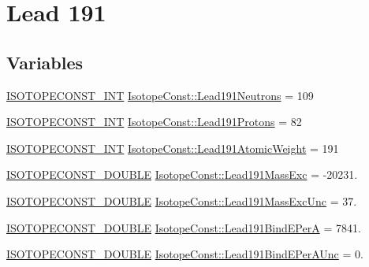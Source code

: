 \hypertarget{group___isotope_const-_lead-_pb191}{}\section{Lead 191}
\label{group___isotope_const-_lead-_pb191}
\subsection*{Variables}
\begin{DoxyCompactItemize}
\item 
\mbox{\hyperlink{group___isotope_const-_macros_ga5f18360b3e99483a35c32d789e62621c}{I\+S\+O\+T\+O\+P\+E\+C\+O\+N\+S\+T\+\_\+\+I\+NT}} \mbox{\hyperlink{group___isotope_const-_lead-_pb191_ga8abe12661e91a3b5e4f3ae4118067eb7}{Isotope\+Const\+::\+Lead191\+Neutrons}} = 109
\item 
\mbox{\hyperlink{group___isotope_const-_macros_ga5f18360b3e99483a35c32d789e62621c}{I\+S\+O\+T\+O\+P\+E\+C\+O\+N\+S\+T\+\_\+\+I\+NT}} \mbox{\hyperlink{group___isotope_const-_lead-_pb191_gac6bfe4c1c26fee92742d2b5dbd232f96}{Isotope\+Const\+::\+Lead191\+Protons}} = 82
\item 
\mbox{\hyperlink{group___isotope_const-_macros_ga5f18360b3e99483a35c32d789e62621c}{I\+S\+O\+T\+O\+P\+E\+C\+O\+N\+S\+T\+\_\+\+I\+NT}} \mbox{\hyperlink{group___isotope_const-_lead-_pb191_ga7e2f90d84532663469020218d456ecb8}{Isotope\+Const\+::\+Lead191\+Atomic\+Weight}} = 191
\item 
\mbox{\hyperlink{group___isotope_const-_macros_ga8f45a7272ce02c0b4c65c44636ed719a}{I\+S\+O\+T\+O\+P\+E\+C\+O\+N\+S\+T\+\_\+\+D\+O\+U\+B\+LE}} \mbox{\hyperlink{group___isotope_const-_lead-_pb191_ga5207f1a8d1a85605377d9bf6adfb76cf}{Isotope\+Const\+::\+Lead191\+Mass\+Exc}} = -\/20231.
\item 
\mbox{\hyperlink{group___isotope_const-_macros_ga8f45a7272ce02c0b4c65c44636ed719a}{I\+S\+O\+T\+O\+P\+E\+C\+O\+N\+S\+T\+\_\+\+D\+O\+U\+B\+LE}} \mbox{\hyperlink{group___isotope_const-_lead-_pb191_ga5283d36bd2bc1a2c33534109d2dccc30}{Isotope\+Const\+::\+Lead191\+Mass\+Exc\+Unc}} = 37.
\item 
\mbox{\hyperlink{group___isotope_const-_macros_ga8f45a7272ce02c0b4c65c44636ed719a}{I\+S\+O\+T\+O\+P\+E\+C\+O\+N\+S\+T\+\_\+\+D\+O\+U\+B\+LE}} \mbox{\hyperlink{group___isotope_const-_lead-_pb191_ga22454ffd1c8db50670040986bc424fd6}{Isotope\+Const\+::\+Lead191\+Bind\+E\+PerA}} = 7841.
\item 
\mbox{\hyperlink{group___isotope_const-_macros_ga8f45a7272ce02c0b4c65c44636ed719a}{I\+S\+O\+T\+O\+P\+E\+C\+O\+N\+S\+T\+\_\+\+D\+O\+U\+B\+LE}} \mbox{\hyperlink{group___isotope_const-_lead-_pb191_ga4729ce128bcf1df0d3a6d1f810a57f60}{Isotope\+Const\+::\+Lead191\+Bind\+E\+Per\+A\+Unc}} = 0.

\end{DoxyCompactItemize}
